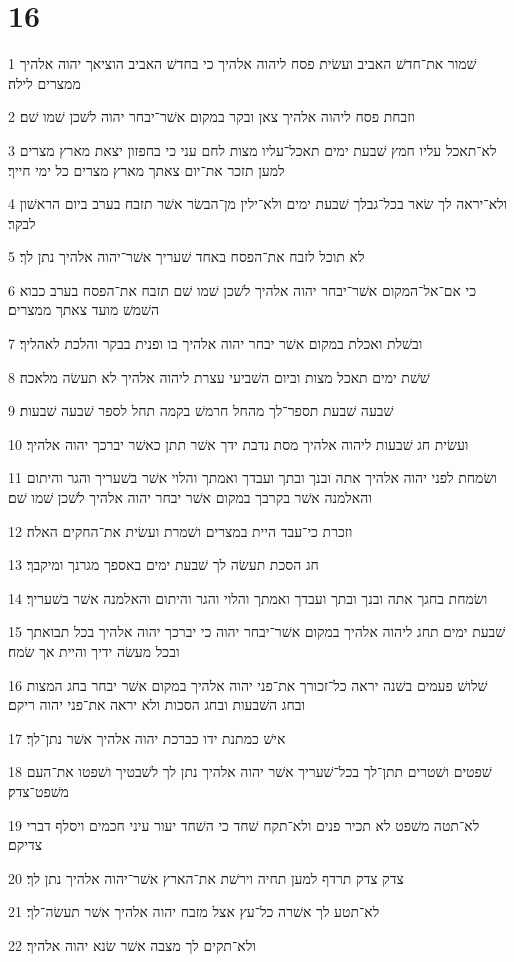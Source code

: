 \chapter{16}

\par 1 שׁמור את־חדשׁ האביב ועשׂית פסח ליהוה אלהיך כי בחדשׁ האביב הוציאך יהוה אלהיך ממצרים לילה׃
\par 2 וזבחת פסח ליהוה אלהיך צאן ובקר במקום אשׁר־יבחר יהוה לשׁכן שׁמו שׁם׃
\par 3 לא־תאכל עליו חמץ שׁבעת ימים תאכל־עליו מצות לחם עני כי בחפזון יצאת מארץ מצרים למען תזכר את־יום צאתך מארץ מצרים כל ימי חייך׃
\par 4 ולא־יראה לך שׂאר בכל־גבלך שׁבעת ימים ולא־ילין מן־הבשׂר אשׁר תזבח בערב ביום הראשׁון לבקר׃
\par 5 לא תוכל לזבח את־הפסח באחד שׁעריך אשׁר־יהוה אלהיך נתן לך׃
\par 6 כי אם־אל־המקום אשׁר־יבחר יהוה אלהיך לשׁכן שׁמו שׁם תזבח את־הפסח בערב כבוא השׁמשׁ מועד צאתך ממצרים׃
\par 7 ובשׁלת ואכלת במקום אשׁר יבחר יהוה אלהיך בו ופנית בבקר והלכת לאהליך׃
\par 8 שׁשׁת ימים תאכל מצות וביום השׁביעי עצרת ליהוה אלהיך לא תעשׂה מלאכה׃
\par 9 שׁבעה שׁבעת תספר־לך מהחל חרמשׁ בקמה תחל לספר שׁבעה שׁבעות׃
\par 10 ועשׂית חג שׁבעות ליהוה אלהיך מסת נדבת ידך אשׁר תתן כאשׁר יברכך יהוה אלהיך׃
\par 11 ושׂמחת לפני יהוה אלהיך אתה ובנך ובתך ועבדך ואמתך והלוי אשׁר בשׁעריך והגר והיתום והאלמנה אשׁר בקרבך במקום אשׁר יבחר יהוה אלהיך לשׁכן שׁמו שׁם׃
\par 12 וזכרת כי־עבד היית במצרים ושׁמרת ועשׂית את־החקים האלה׃
\par 13 חג הסכת תעשׂה לך שׁבעת ימים באספך מגרנך ומיקבך׃
\par 14 ושׂמחת בחגך אתה ובנך ובתך ועבדך ואמתך והלוי והגר והיתום והאלמנה אשׁר בשׁעריך׃
\par 15 שׁבעת ימים תחג ליהוה אלהיך במקום אשׁר־יבחר יהוה כי יברכך יהוה אלהיך בכל תבואתך ובכל מעשׂה ידיך והיית אך שׂמח׃
\par 16 שׁלושׁ פעמים בשׁנה יראה כל־זכורך את־פני יהוה אלהיך במקום אשׁר יבחר בחג המצות ובחג השׁבעות ובחג הסכות ולא יראה את־פני יהוה ריקם׃
\par 17 אישׁ כמתנת ידו כברכת יהוה אלהיך אשׁר נתן־לך׃
\par 18 שׁפטים ושׁטרים תתן־לך בכל־שׁעריך אשׁר יהוה אלהיך נתן לך לשׁבטיך ושׁפטו את־העם משׁפט־צדק׃
\par 19 לא־תטה משׁפט לא תכיר פנים ולא־תקח שׁחד כי השׁחד יעור עיני חכמים ויסלף דברי צדיקם׃
\par 20 צדק צדק תרדף למען תחיה וירשׁת את־הארץ אשׁר־יהוה אלהיך נתן לך׃
\par 21 לא־תטע לך אשׁרה כל־עץ אצל מזבח יהוה אלהיך אשׁר תעשׂה־לך׃
\par 22 ולא־תקים לך מצבה אשׁר שׂנא יהוה אלהיך׃

